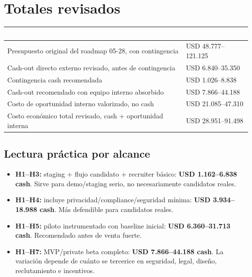 \documentclass[11pt,a4paper]{article}
\begin{document}
\section{Totales revisados}
\begin{tabularx}{\linewidth}{@{}L Y@{}}
\toprule
{}\textcolor{white}{\textbf{Concepto}} & \textcolor{white}{\textbf{Rango}} \\
\midrule
Presupuesto original del roadmap 05-28, con contingencia & USD 48.777--121.125 \\
Cash-out directo externo revisado, antes de contingencia & USD 6.840--35.350 \\
Contingencia cash recomendada & USD 1.026--8.838 \\
Cash-out recomendado con equipo interno absorbido & USD 7.866--44.188 \\
Costo de oportunidad interno valorizado, no cash & USD 21.085--47.310 \\
Costo económico total revisado, cash + oportunidad interna & USD 28.951--91.498 \\

\bottomrule
\end{tabularx}

\subsection{Lectura práctica por alcance}
\begin{itemize}
  \item \textbf{H1--H3:} staging + flujo candidato + recruiter básico: \textbf{USD 1.162--6.838 cash}. Sirve para demo/staging serio, no necesariamente candidatos reales.
  \item \textbf{H1--H4:} incluye privacidad/compliance/seguridad mínima: \textbf{USD 3.934--18.988 cash}. Más defendible para candidatos reales.
  \item \textbf{H1--H5:} piloto instrumentado con baseline inicial: \textbf{USD 6.360--31.713 cash}. Recomendado antes de venta fuerte.
  \item \textbf{H1--H7:} MVP/private beta completo: \textbf{USD 7.866--44.188 cash}. La variación depende de cuánto se tercerice en seguridad, legal, diseño, reclutamiento e incentivos.
\end{itemize}
\end{document}
